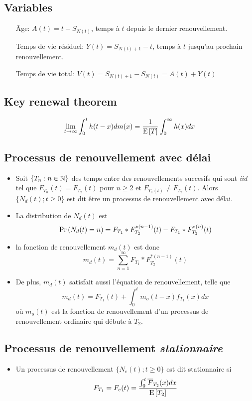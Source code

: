 \documentclass[10pt, french, landscape]{article}
\begin{document}
\begin{multicols*}{2}
\subsection*{Variables}

\begin{enumerate}
	\item[Âge:]	$A(t) = t - S_{N(t)}$, temps à $t$ depuis le dernier renouvellement.
	\item[Temps de vie résiduel:]	$Y(t) = S_{N(t) + 1} - t$, temps à $t$ jusqu'au prochain renouvellement.
	\item[Temps de vie total:]	$V(t) = S_{N(t) + 1} - S_{N(t)} = A(t) + Y(t)$
\end{enumerate}

\subsection*{Key renewal theorem}
\[\lim_{t \to \infty} \int_{0}^{t} h(t-x) d m(x) = \frac{1}{\mathrm{E} \left[ T \right]} \int_{0}^{\infty} h(x) dx \]

\subsection*{Processus de renouvellement avec délai}
\begin{itemize}
\item Soit $\{ T_n : n \in \mathbb{N} \}$ des temps entre des renouvellements succesifs qui sont \emph{iid} tel que $F_{T_n}(t) = F_{T_2}(t)$ pour $n \geq 2$ et $F_{T_1(t)} \neq F_{T_2}(t)$. Alors $\{N_d(t) ; t \geq 0 \}$ est dit être un processus de renouvellement avec délai. 

\item La distribution de $N_d(t)$ est
\[\Pr \left( N_d(t) = n \right) = F_{T_1} \ast F_{T_2}^{\ast(n-1)}(t) - F_{T_1} \ast F_{T_2}^{\ast (n)}(t)  \]

\item la fonction de renouvellement $m_d(t)$ est donc
\[m_d(t) = \sum_{n=1}^{\infty} F_{T_1} \ast F_{T_2}^{\ast (n-1)}(t)  \]

\item De plus, $m_d(t)$ satisfait aussi l'équation de renouvellement, telle que
\[m_d(t) = F_{T_1}(t) + \int_{0}^{t}  m_o(t-x) f_{T_1}(x) dx \]
où $m_o(t)$ est la fonction de renouvellement d'un processus de renouvellement ordinaire qui débute à $T_2$.
\end{itemize}

\subsection*{Processus de renouvellement \emph{stationnaire}}
\begin{itemize}
\item Un processus de renouvellement $\{ N_e(t) ; t \geq 0 \}$ est dit stationnaire si
\[F_{T_1} = F_e(t) = \frac{\int_{0}^{t} \overline{F}_{T_2}(x) dx  }{\mathrm{E} \left[ T_2 \right]}\]


\end{itemize}
\end{multicols*}
\end{document}

